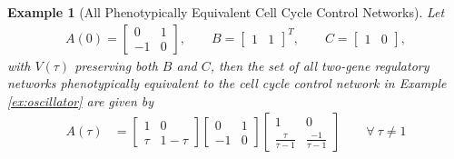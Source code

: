 \documentclass{article}
\newcommand{\1}{\mathbbm{1}}
\newtheorem{example}{Example}
\begin{document}
  \begin{example}[All Phenotypically Equivalent Cell Cycle Control Networks]

    Let
    \begin{align*}
      A(0) = \begin{bmatrix} 0 & 1 \\ -1 & 0 \end{bmatrix}, \qquad B = \begin{bmatrix} 1 & 1 \end{bmatrix}^{T}, \qquad C = \begin{bmatrix} 1 & 0 \end{bmatrix},
    \end{align*}
    with $V(\tau)$ preserving both $B$ and $C$, then
    the set of all two-gene regulatory networks phenotypically equivalent to the cell cycle control network in Example \ref{ex:oscillator} are given by
    \begin{align*}
      A(\tau) &= \begin{bmatrix} 1 & 0 \\ \tau & 1-\tau \end{bmatrix} \begin{bmatrix} 0 & 1 \\ -1 & 0 \end{bmatrix} \begin{bmatrix} 1 & 0 \\ \frac{\tau}{\tau-1} & \frac{-1}{\tau-1} \end{bmatrix}  \qquad \forall \ \tau \neq 1 %
    \end{align*}
    \begin{figure}[H]
    \centering
{}
\end{figure}
\end{example}
\end{document}
